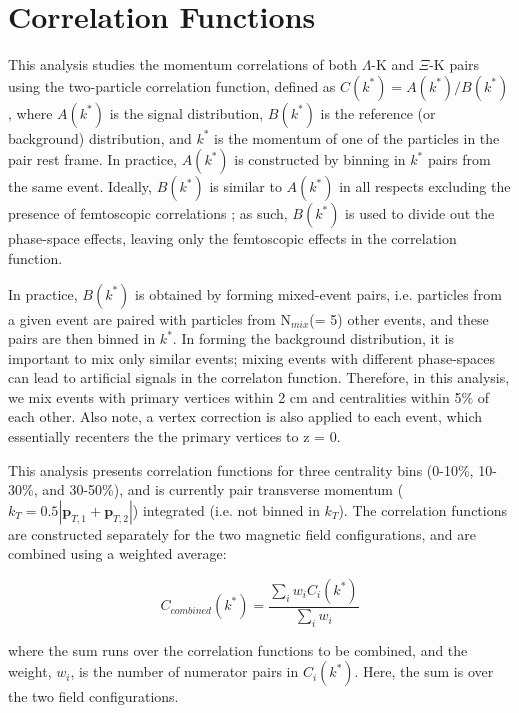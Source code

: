\documentclass[../AnalysisNoteJBuxton.tex]{subfiles}
\begin{document}
\section{Correlation Functions}
\label{CorrelationFunctions}


This analysis studies the momentum correlations of both $\Lambda$-K and $\Xi$-K pairs using the two-particle correlation function, defined as $C(k^{*}) = A(k^{*})/B(k^{*})$, where $A(k^{*})$ is the signal distribution, $B(k^{*})$ is the reference (or background) distribution, and $k^{*}$ is the momentum of one of the particles in the pair rest frame.
In practice, $A(k^{*})$ is constructed by binning in $k^{*}$ pairs from the same event.
Ideally, $B(k^{*})$ is similar to $A(k^{*})$ in all respects excluding the presence of femtoscopic correlations \cite{Lisa:2005dd}; as such, $B(k^{*})$ is used to divide out the phase-space effects, leaving only the femtoscopic effects in the correlation function. 

In practice, $B(k^{*})$ is obtained by forming mixed-event pairs, i.e. particles from a given event are paired with particles from N$_{mix}$(= 5) other events, and these pairs are then binned in $k^{*}$.
In forming the background distribution, it is important to mix only similar events; mixing events with different phase-spaces can lead to artificial signals in the correlaton function.
Therefore, in this analysis, we mix events with primary vertices within 2 cm and centralities within 5\% of each other.
Also note, a vertex correction is also applied to each event, which essentially recenters the the primary vertices to z = 0.

This analysis presents correlation functions for three centrality bins (0-10\%, 10-30\%, and 30-50\%), and is currently pair transverse momentum ($k_{T} = 0.5|\mathbf{p}_{T,1}+\mathbf{p}_{T,2}|$) integrated (i.e. not binned in $k_{T}$).  
The correlation functions are constructed separately for the two magnetic field configurations, and are combined using a weighted average:

\begin{equation}
  C_{combined}(k^{*}) = \frac{\sum\limits_{i}w_{i}C_{i}(k^{*})}{\sum\limits_{i}w_{i}} 
\label{eqn:CombineCfs}
\end{equation}

where the sum runs over the correlation functions to be combined, and the weight, $w_{i}$, is the number of numerator pairs in $C_{i}(k^{*})$.
Here, the sum is over the two field configurations.
\end{document}
